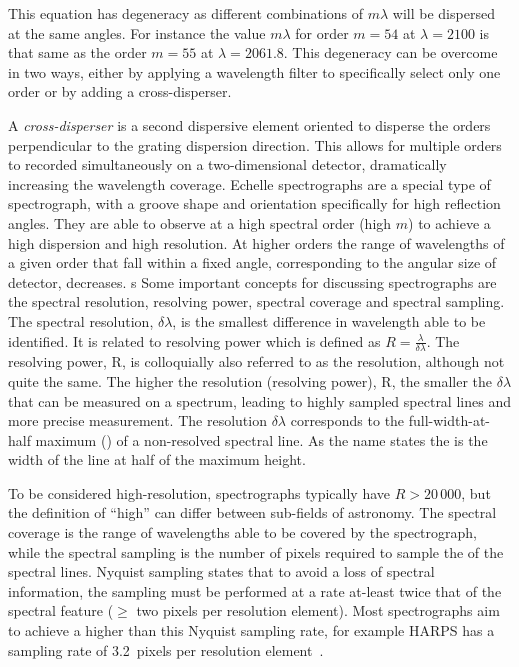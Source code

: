 This equation has degeneracy as different combinations of \(m \lambda\) will be dispersed at the same angles.
For instance the value \(m \lambda\) for order \(m=54\) at \(\lambda=2100\)\nm{} is that same as the order \(m=55\) at \(\lambda=2061.8\)\nm{}.
This degeneracy can be overcome in two ways, either by applying a wavelength filter to specifically select only one order or by adding a cross-disperser.

A \emph{cross-disperser} is a second dispersive element oriented to disperse the orders perpendicular to the grating dispersion direction.
This allows for multiple orders to recorded simultaneously on a two-dimensional detector, dramatically increasing the wavelength coverage.
Echelle spectrographs are a special type of spectrograph, with a groove shape and orientation specifically for high reflection angles. They are able to observe at a high spectral order (high \(m\)) to achieve a high dispersion and high resolution. At higher orders the range of wavelengths of a given order that fall within a fixed angle, corresponding to the angular size of detector, decreases.
s
Some important concepts for discussing spectrographs are the spectral resolution, resolving power, spectral coverage and spectral sampling.
The spectral resolution, \(\delta \lambda\), is the smallest difference in wavelength able to be identified.
It is related to resolving power which is defined as \(R=\frac{\lambda}{\delta\lambda}\).
The resolving power, R, is colloquially also referred to as the resolution, although not quite the same.
The higher the resolution (resolving power), R, the smaller the \(\delta\lambda\) that can be measured on a spectrum, leading to highly sampled spectral lines and more precise measurement.
The resolution \(\delta\lambda\) corresponds to the full-width-at-half maximum (\fwhm{}) of a non-resolved spectral line. As the name states the \fwhm{} is the width of the line at half of the maximum height.

To be considered high-resolution, spectrographs typically have \(R>20\,000\), but the definition of ``high'' can differ between sub-fields of astronomy.
The spectral coverage is the range of wavelengths able to be covered by the spectrograph, while the spectral sampling is the number of pixels required to sample the \fwhm{} of the spectral lines.
Nyquist sampling states that to avoid a loss of spectral information, the sampling must be performed at a rate at-least twice that of the spectral feature (\(\ge\) two pixels per resolution element).
Most spectrographs aim to achieve a higher than this Nyquist sampling rate, for example {HARPS} has a sampling rate of 3.2~pixels per resolution element~\citep{pepe_setting_2003}.

